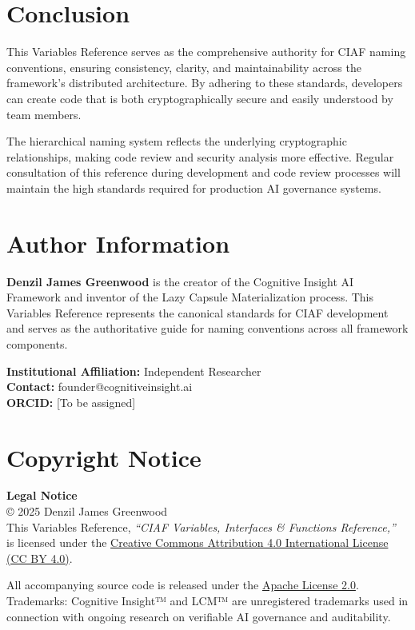 \documentclass[12pt,a4paper]{article}
\begin{document}
\newpage

\section*{Conclusion}

This Variables Reference serves as the comprehensive authority for CIAF naming conventions, ensuring consistency, clarity, and maintainability across the framework's distributed architecture. By adhering to these standards, developers can create code that is both cryptographically secure and easily understood by team members.

The hierarchical naming system reflects the underlying cryptographic relationships, making code review and security analysis more effective. Regular consultation of this reference during development and code review processes will maintain the high standards required for production AI governance systems.

\section*{Author Information}

\textbf{Denzil James Greenwood} is the creator of the Cognitive Insight AI Framework and inventor of the Lazy Capsule Materialization process. This Variables Reference represents the canonical standards for CIAF development and serves as the authoritative guide for naming conventions across all framework components.

\textbf{Institutional Affiliation:} Independent Researcher \\
\textbf{Contact:} founder@cognitiveinsight.ai \\
\textbf{ORCID:} [To be assigned]

\section*{Copyright Notice}

\begin{infobox}
\textbf{Legal Notice}\\
© 2025 Denzil James Greenwood \\
This Variables Reference, \textit{``CIAF Variables, Interfaces \& Functions Reference,''} \\
is licensed under the \href{https://creativecommons.org/licenses/by/4.0/}{Creative Commons Attribution 4.0 International License (CC BY 4.0)}.

All accompanying source code is released under the \href{https://www.apache.org/licenses/LICENSE-2.0}{Apache License 2.0}. \\
Trademarks: Cognitive Insight™ and LCM™ are unregistered trademarks used in connection with ongoing research on verifiable AI governance and auditability.
\end{infobox}
\end{document}
